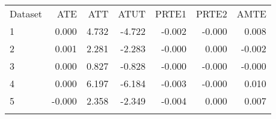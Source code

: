 \begin{center}
\begin{tabular}{lrrrrrr}
\hline \noalign{\smallskip}Dataset & ATE & ATT & ATUT & PRTE1 & PRTE2 & AMTE\\
\noalign{\smallskip}\hline \noalign{\smallskip}1 & 0.000 & 4.732 & -4.722 & -0.002 & -0.000 & 0.008\\
2 & 0.001 & 2.281 & -2.283 & -0.000 & 0.000 & -0.002\\
3 & 0.000 & 0.827 & -0.828 & -0.000 & -0.000 & -0.000\\
4 & 0.000 & 6.197 & -6.184 & -0.003 & -0.000 & 0.010\\
5 & -0.000 & 2.358 & -2.349 & -0.004 & 0.000 & 0.007\\
\noalign{\smallskip}\hline\end{tabular}\\
\end{center}
